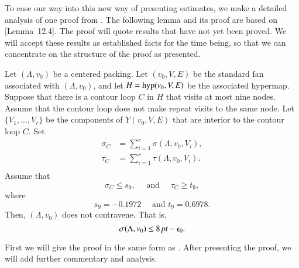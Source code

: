 To ease our way into this new way of presenting estimates, 
we make a detailed analysis of
one proof from \cite{DCG}.  The following lemma and its proof are
based on \cite{DCG}[Lemma~12.4].  The proof will quote results that
have not yet been proved.  We will accept these results 
as established facts for the time being, 
so that we can concentrate on the structure
of the proof as presented.


\begin{lemma}\label{lemma:nonagon}  
Let $(\Lambda,v_0)$ be a centered packing.
Let $(v_0,V,E)$ be the standard fan associated with $(\Lambda,v_0)$,
and let $H={\operatorname{hyp}}(v_0,V,E)$ be the associated hypermap.  
Suppose that there is a contour loop $C$ in $H$ that visits
at most nine nodes.  Assume that the contour loop does not make
repeat visits to the same node.
Let $\{V_1,\ldots,V_r\}$ be the components of $Y(v_0,V,E)$ that
are interior to the contour loop $C$.
Set 
   $$
   \begin{array}{lll}
   \sigma_C &= \sum_{i=1}^r \sigma(\Lambda,v_0,V_i),\\
   \tau_C &= \sum_{i=1}^r \tau(\Lambda,v_0,V_i).\\
   \end{array}
   $$
Assume that
    $$
    \sigma_C \le s_9,\quad \text{ and } \quad \tau_C \ge t_9,
    $$
where 
    $$
    s_9 = -0.1972 \quad \text{ and } t_9 = 0.6978.
    $$
Then, $(\Lambda,v_0)$ does not contravene.  That is,
$$
\sigma(\Lambda,v_0) \le 8\,\hbox{\it pt} - \epsilon_0.
$$
\end{lemma}

First we will give the proof in the same form as \cite{DCG}.
After presenting the proof, we will add further commentary and analysis.


